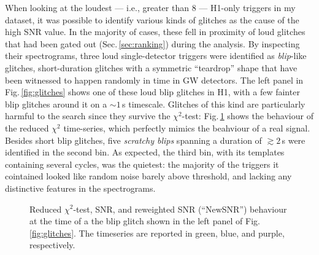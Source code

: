 \documentclass[binding=0.6cm, LaM]{sapthesis}
\begin{document}
	When looking at the loudest --- i.e., greater than 8 --- H1-only triggers in my dataset,
	it was possible to identify various kinds of glitches as the cause of the high SNR value.
	In the majority of cases, these fell in proximity of loud glitches that had been gated out (Sec.\,\ref{sec:ranking}) during the analysis.
	By inspecting their spectrograms, three loud single-detector triggers were identified as {\it blip}-like glitches,
	short-duration glitches with a symmetric ``teardrop'' shape that have been witnessed to happen randomly in time in GW detectors.
	The left panel in Fig.\,\ref{fig:glitches} shows one of these loud blip glitches in H1, with a few fainter blip glitches around it on a $\sim 1\,$s timescale.
        Glitches of this kind are particularly harmful to the search since they survive the $\chi^2$-test: 
	Fig.\,\ref{fig:chisquared} shows the behaviour of the reduced $\chi^2$ time-series, which perfectly mimics the beahviour of a real signal.
	Besides short blip glitches, five \emph{scratchy blips} spanning a duration of $\gtrsim 2\,$s were identified in the second bin.
	As expected, the third bin, with its templates containing several cycles, was the quietest: the majority of the triggers it cointained looked like random noise barely above threshold, and 
	lacking any distinctive features in the spectrograms.

	 \begin{figure}[t]
          \noindent
          \label{chisquared}
          \centering
          \caption{Reduced $\chi^2$-test, SNR, and reweighted SNR
            (``NewSNR'') behaviour at the time of a the blip glitch
            shown in the left panel of Fig.\,\ref{fig:glitches}.  The
            timeseries are reported in green, blue, and purple,
            respectively.}
          \label{fig:chisquared}
        \end{figure}
\end{document}
